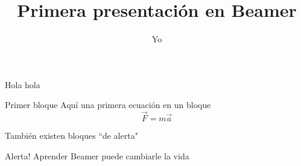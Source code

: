 \documentclass{beamer}
\begin{document}
\title{Primera presentaci\'on en Beamer}
\author{Yo}
\maketitle

\begin{frame}
Hola hola
\begin{block}{Primer bloque}
Aqu\'i una primera ecuaci\'on en un bloque
\begin{equation}
\vec{F}=m\vec{a}
\end{equation}
\end{block}

\end{frame}

\begin{frame}
Tambi\'en existen bloques ``de alerta"
\begin{alertblock}{Alerta!}
Aprender Beamer puede cambiarle la vida
\end{alertblock}
\end{frame}
\end{document}

